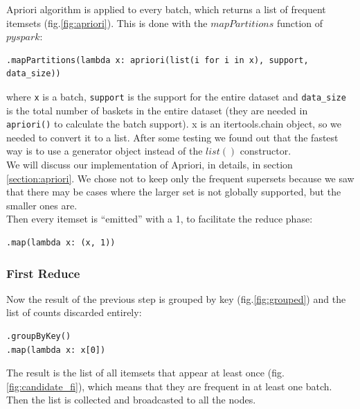 \documentclass[a4paper]{article}
\begin{document}
	Apriori algorithm is applied to every batch, which returns a list of frequent itemsets (fig.\ref{fig:apriori}). This is done with the $mapPartitions$ function of $pyspark$: 
\begin{lstlisting}[numbers=none]
.mapPartitions(lambda x: apriori(list(i for i in x), support, data_size))
\end{lstlisting}
	where \texttt{x} is a batch, \texttt{support} is the support for the entire dataset and \texttt{data\_size} is the total number of baskets in the entire dataset (they are needed in \texttt{apriori()} to calculate the batch support).
	x is an itertools.chain object, so we needed to convert it to a list. After some testing we found out that the fastest way is to use a generator object instead of the $list()$ constructor.\\
	We will discuss our implementation of Apriori, in details, in section \ref{section:apriori}. We chose not to keep only the frequent supersets because we saw that there may be cases where the larger set is not globally supported, but the smaller ones are.\\
	Then every itemset is ``emitted'' with a 1, to facilitate the reduce phase:
\begin{lstlisting}[numbers=none]
.map(lambda x: (x, 1))
\end{lstlisting}
	
	\subsubsection{First Reduce}
	Now the result of the previous step is grouped by key (fig.\ref{fig:grouped}) and the list of counts discarded entirely:
	\begin{lstlisting}
.groupByKey()
.map(lambda x: x[0])
\end{lstlisting}
	The result is the list of all itemsets that appear at least once (fig.\ref{fig:candidate_fi}), which means that they are frequent in at least one batch.\\
	Then the list is collected and broadcasted to all the nodes.
	
\end{document}

